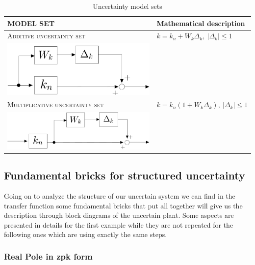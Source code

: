 \documentclass[a4paper, 12pt]{article}
\begin{document}
\begin{table}[h]
    \centering
    \begin{tabular}{p{8cm} p{6cm}}
        \toprule[1pt]
        \textbf{MODEL SET}&\textbf{Mathematical description}\\
        \midrule
        \textsc{Additive uncertainty set}&$k=k_n+W_k{\Delta_k}, \ \vert \Delta_k \vert \le 1$  \\\includegraphics[scale=0.12]{img/add_k.jpg}\\
        \midrule
        \textsc{Multiplicative uncertainty set}&$k=k_n(1+W_k\Delta_k), \ \vert \Delta_k \vert \le1$ \\ \includegraphics[scale=0.14]{img/mul_k.jpg}\\
        \bottomrule[1pt]
    \end{tabular}
    \caption{Uncertainty model sets}
    \label{tab:uncertainty_set}
\end{table}


\subsection{Fundamental bricks for structured uncertainty}
Going on to analyze the structure of our uncertain system we can find in the transfer function some fundamental bricks that put all together will give us the description through block diagrams of the uncertain plant. \textsf{Some aspects are presented in details for the first example while they are not repeated for the following ones which are using exactly the same steps.}

\subsubsection{Real Pole in zpk form}
\end{document}
